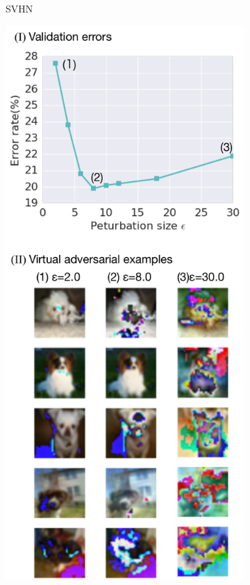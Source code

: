 \documentclass[10pt,journal,compsoc]{IEEEtran}
\begin{document}
\begin{figure}
\begin{subfigure}{0.35\textwidth}
	\caption{\label{fig:svhn_epsilon_vae}SVHN}
    \end{subfigure}\hfill%
    \begin{subfigure}{0.35\textwidth}
	\includegraphics[width=\textwidth]{cifar10/vae.pdf}

\end{subfigure}
\end{figure}
\end{document}
